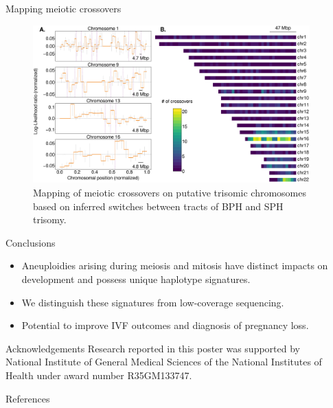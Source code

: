 \documentclass[final]{beamer}
\newlength{\sepwidth}
\newlength{\colwidth}
\newcommand{\separatorcolumn}{\begin{column}{\sepwidth}\end{column}}
\begin{document}
\begin{frame}[t]
\begin{columns}[t]
\begin{column}{\colwidth}
\begin{block}{Mapping meiotic crossovers}
        \begin{figure}
      \centering
     \includegraphics[width=.8\linewidth]{figures/fig8.pdf}

     \caption{Mapping of meiotic crossovers on putative trisomic chromosomes based on inferred switches between tracts of BPH and SPH trisomy.}
    \end{figure}
\end{block}
    
\begin{block}{Conclusions}
\begin{itemize}
	\item{Aneuploidies arising during 
	meiosis and mitosis have distinct impacts on development and possess unique haplotype signatures.}
	\item{We distinguish these signatures from low-coverage sequencing.}
    \item{Potential to improve IVF outcomes and diagnosis of pregnancy loss.}
\end{itemize}
\end{block}

\begin{block}{Acknowledgements}\footnotesize
Research reported in this poster was supported by National Institute of General Medical Sciences of the National Institutes of Health under award number R35GM133747.
\end{block}

  \begin{block}{References}

    \nocite{*}
    \footnotesize{}

  \end{block}
\end{column}
\separatorcolumn

\end{columns}
\end{frame}
\end{document}
